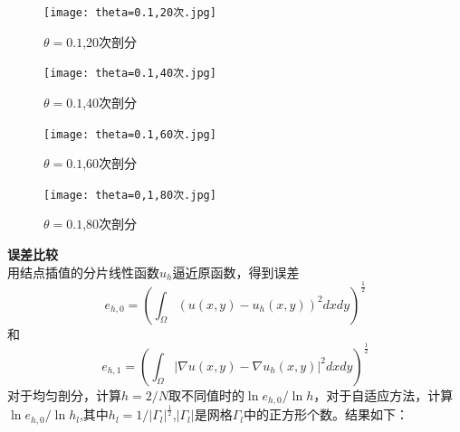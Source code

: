 \documentclass[12pt,fontset=mac]{ctexart}
\begin{document}
\begin{figure}[H]
	\centering
	\begin{minipage}[t]{0.48\textwidth}
		\centering
		\texttt{[image: theta=0.1,20次.jpg]}
		\caption{$\theta=0.1$,20次剖分}
	\end{minipage}
	\begin{minipage}[t]{0.48\textwidth}
		\centering
		\texttt{[image: theta=0.1,40次.jpg]}
		\caption{$\theta=0.1$,40次剖分}
	\end{minipage}
\end{figure}
\begin{figure}[H]
	\centering
	\begin{minipage}[t]{0.48\textwidth}
		\centering
		\texttt{[image: theta=0.1,60次.jpg]}
		\caption{$\theta=0.1$,60次剖分}
	\end{minipage}
	\begin{minipage}[t]{0.48\textwidth}
		\centering
		\texttt{[image: theta=0,1,80次.jpg]}
		\caption{$\theta=0.1$,80次剖分}
	\end{minipage}
\end{figure}
\noindent \textbf{误差比较}\\
用结点插值的分片线性函数$u_h$逼近原函数，得到误差
$$e_{h,0} = (\int_{\Omega}(u(x,y)-u_h(x,y))^2dxdy)^\frac{1}{2}$$
和
$$e_{h,1} = (\int_{\Omega}|\nabla u(x,y)-\nabla u_h(x,y)|^2dxdy)^\frac{1}{2}$$
对于均匀剖分，计算$h=2/N$取不同值时的$\ln e_{h,0}/\ln{h}$，对于自适应方法，计算$\ln e_{h,0}/\ln{h_l}$,其中$h_l=1/|\varGamma_{l}|^\frac{1}{2}$,$|\varGamma_{l}|$是网格$\varGamma_{l}$中的正方形个数。结果如下：\\
\end{document}

